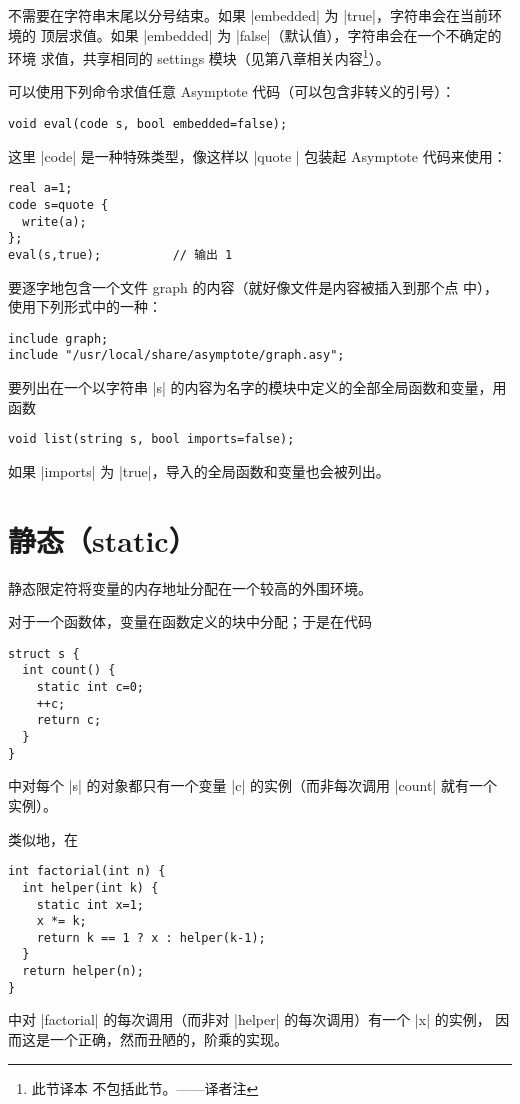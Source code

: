 \documentclass{ctexbook}
\newcommand*\prgname[1]{\textsf{#1}}
\newcommand\transnote[1]{\footnote{#1——译者注}}
\begin{document}
{{{不需要在字符串末尾以分号结束。如果 |embedded| 为 |true|，字符串会在当前环境的
顶层求值。如果 |embedded| 为 |false|（默认值），字符串会在一个不确定的环境
求值，共享相同的 \prgname{settings} 模块（见第八章相关内容\transnote{此节译本
不包括此节。}）。

可以使用下列命令求值任意 \prgname{Asymptote} 代码（可以包含非转义的引号）：
\begin{lstlisting}
void eval(code s, bool embedded=false);
\end{lstlisting}

这里 |code| 是一种特殊类型，像这样以 |quote {}| 包装起 \prgname{Asymptote}
代码来使用：
\begin{lstlisting}
real a=1;
code s=quote {
  write(a);
};
eval(s,true);          // 输出 1
\end{lstlisting}

要逐字地包含一个文件 \prgname{graph} 的内容（就好像文件是内容被插入到那个点
中），使用下列形式中的一种：
\begin{lstlisting}
include graph;
include "/usr/local/share/asymptote/graph.asy";
\end{lstlisting}

要列出在一个以字符串 |s| 的内容为名字的模块中定义的全部全局函数和变量，用函数
\begin{lstlisting}
void list(string s, bool imports=false);
\end{lstlisting}
如果 |imports| 为 |true|，导入的全局函数和变量也会被列出。



\section{静态（static）}
\label{sec:static}

静态限定符将变量的内存地址分配在一个较高的外围环境。

对于一个函数体，变量在函数定义的块中分配；于是在代码
\begin{lstlisting}
struct s {
  int count() {
    static int c=0;
    ++c;
    return c;
  }
}
\end{lstlisting}
中对每个 |s| 的对象都只有一个变量 |c| 的实例（而非每次调用 |count| 就有一个
实例）。

类似地，在
\begin{lstlisting}
int factorial(int n) {
  int helper(int k) {
    static int x=1;
    x *= k;
    return k == 1 ? x : helper(k-1);
  }
  return helper(n);
}
\end{lstlisting}
中对 |factorial| 的每次调用（而非对 |helper| 的每次调用）有一个 |x| 的实例，
因而这是一个正确，然而丑陋的，阶乘的实现。

}}}
\end{document}
